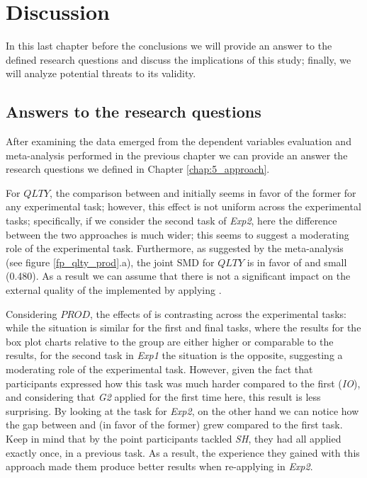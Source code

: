 \chapter{Discussion}
\label{chap:6_discussion}
In this last chapter before the conclusions we will provide an answer to the defined research questions and discuss the implications of this study; finally, we will analyze potential threats to its validity.

\section{Answers to the research questions}
After examining the data emerged from the dependent variables evaluation and meta-analysis performed in the previous chapter we can provide an answer the research questions we defined in Chapter \ref{chap:5_approach}.

For $QLTY$, the comparison between \tdd and \notdd initially seems in favor of the former for any experimental task; however, this effect is not uniform across the experimental tasks; specifically, if we consider the second task of \textit{Exp2}, here the difference between the two approaches is much wider; this seems to suggest a moderating role of the experimental task. Furthermore, as suggested by the meta-analysis (see figure \ref{fp_qlty_prod}.a), the joint SMD for $QLTY$ is in favor of \tdd and small (0.480).
As a result we can assume that there is not a significant impact on the external quality of the implemented \es by applying \tdd. 

Considering $PROD$, the effects of \tdd is contrasting across the experimental tasks: while the situation is similar for the first and final tasks, where the results for the box plot charts relative to the \tdd group are either higher or comparable to the \notdd results, for the second task in \textit{Exp1} the situation is the opposite, suggesting a moderating role of the experimental task. 
However, given the fact that participants expressed how this task was much harder compared to the first (\ie \textit{IO}), and considering that \textit{G2} applied \tdd for the first time here, this result is less surprising.
By looking at the task for \textit{Exp2}, on the other hand we can notice how the gap between \tdd and \notdd (in favor of the former) grew compared to the first task. Keep in mind that by the point participants tackled \textit{SH}, they had all applied \tdd exactly once, in a previous task. As a result, the experience they gained with this approach made them produce better results when re-applying \tdd in \textit{Exp2}.


